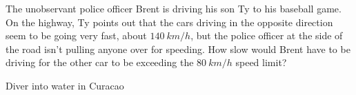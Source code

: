 \begin{problem}{The unobservant police officer}
Brent is driving his son Ty to his baseball game. On the highway, Ty points out that the cars driving in the opposite direction seem to be going very fast, about $\SI{140}{km/h}$, but the police officer at the side of the road isn't pulling anyone over for speeding. How slow would Brent have to be driving for the other car to be exceeding the $\SI{80}{km/h}$ speed limit?
\end{problem}

\begin{problem}
Diver into water in Curacao
\end{problem}